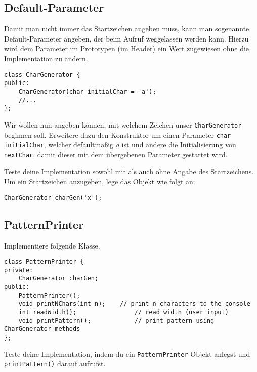 \subsection{Default-Parameter}
Damit man nicht immer das Startzeichen angeben muss, kann man sogenannte Default-Parameter angeben, der beim Aufruf weggelassen werden kann.
Hierzu wird dem Parameter im Prototypen (im Header) ein Wert zugewiesen ohne die Implementation zu ändern.

\begin{lstlisting}
class CharGenerator {
public:
	CharGenerator(char initialChar = 'a');
	//...
};
\end{lstlisting}

Wir wollen nun angeben können, mit welchem Zeichen unser \texttt{CharGenerator} beginnen soll.
Erweitere dazu den Konstruktor um einen Parameter \texttt{char initialChar}, welcher defaultmäßig \emph{a} ist und ändere die Initialisierung von \texttt{nextChar}, damit dieser mit dem übergebenen Parameter gestartet wird.

Teste deine Implementation sowohl mit als auch ohne Angabe des Startzeichens.
Um ein Startzeichen anzugeben, lege das Objekt wie folgt an:

\begin{lstlisting}
CharGenerator charGen('x');
\end{lstlisting}


\subsection{PatternPrinter}
Implementiere folgende Klasse.

\begin{lstlisting}
class PatternPrinter {
private:
	CharGenerator charGen;
public:
	PatternPrinter();
	void printNChars(int n);	// print n characters to the console
	int readWidth();				// read width (user input)
	void printPattern();			// print pattern using CharGenerator methods
};
\end{lstlisting}

Teste deine Implementation, indem du ein \texttt{PatternPrinter}-Objekt anlegst und \texttt{printPattern()} darauf aufrufst.

